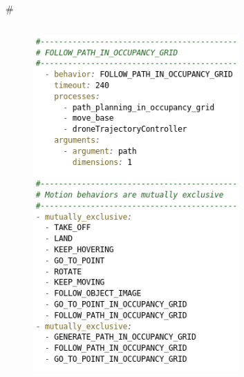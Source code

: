\documentclass[]{beamer}
\newcommand{\mSlideTitle}{{{\color{gray}\secname}} \# \subsecname}
\begin{document}
\begin{frame}{\mSlideTitle}
\begin{columns}
\begin{column}{0.45\textwidth}
\begin{figure}
        \includegraphics[width=0.7\textwidth,keepaspectratio]{BehaviorFPCatalogVertical.png}
      \end{figure}
    \end{column}
  \end{columns}
\end{frame}
\end{document}
